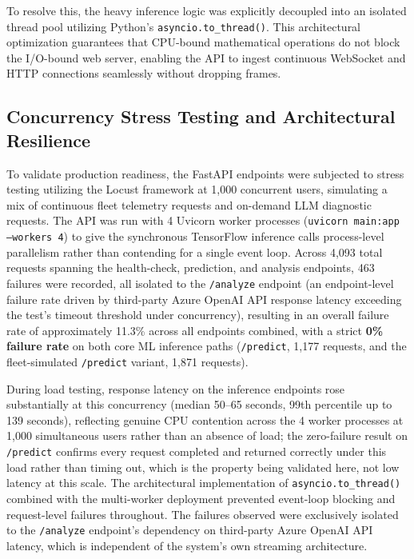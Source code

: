 To resolve this, the heavy inference logic was explicitly decoupled into an isolated thread pool utilizing Python's \texttt{asyncio.to\_thread()}. This architectural optimization guarantees that CPU-bound mathematical operations do not block the I/O-bound web server, enabling the API to ingest continuous WebSocket and HTTP connections seamlessly without dropping frames.

\subsection{Concurrency Stress Testing and Architectural Resilience}
To validate production readiness, the FastAPI endpoints were subjected to stress testing utilizing the Locust framework at 1,000 concurrent users, simulating a mix of continuous fleet telemetry requests and on-demand LLM diagnostic requests. The API was run with 4 Uvicorn worker processes (\texttt{uvicorn main:app --workers 4}) to give the synchronous TensorFlow inference calls process-level parallelism rather than contending for a single event loop. Across 4,093 total requests spanning the health-check, prediction, and analysis endpoints, 463 failures were recorded, all isolated to the \texttt{/analyze} endpoint (an endpoint-level failure rate driven by third-party Azure OpenAI API response latency exceeding the test's timeout threshold under concurrency), resulting in an overall failure rate of approximately 11.3\% across all endpoints combined, with a strict \textbf{0\% failure rate} on both core ML inference paths (\texttt{/predict}, 1,177 requests, and the fleet-simulated \texttt{/predict} variant, 1,871 requests).

During load testing, response latency on the inference endpoints rose substantially at this concurrency (median 50--65 seconds, 99th percentile up to 139 seconds), reflecting genuine CPU contention across the 4 worker processes at 1,000 simultaneous users rather than an absence of load; the zero-failure result on \texttt{/predict} confirms every request completed and returned correctly under this load rather than timing out, which is the property being validated here, not low latency at this scale. The architectural implementation of \texttt{asyncio.to\_thread()} combined with the multi-worker deployment prevented event-loop blocking and request-level failures throughout. The failures observed were exclusively isolated to the \texttt{/analyze} endpoint's dependency on third-party Azure OpenAI API latency, which is independent of the system's own streaming architecture.

